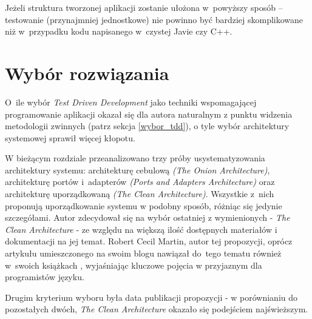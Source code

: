 Jeżeli struktura tworzonej aplikacji zostanie ułożona w~powyższy sposób – testowanie (przynajmniej jednostkowe) nie powinno być bardziej skomplikowane niż w~przypadku kodu napisanego w~czystej Javie czy C++.

\section{Wybór rozwiązania}
\label{wybor_rozwiazania}
O~ile wybór \textit{Test Driven Development} jako techniki wspomagającej programowanie aplikacji okazał się dla autora naturalnym z punktu widzenia metodologii zwinnych (patrz sekcja \ref{wybor_tdd}), o tyle wybór architektury systemowej sprawił więcej kłopotu. 

W bieżącym rozdziale przeanalizowano trzy próby usystematyzowania architektury systemu: architekturę cebulową \textit{(The Onion Architecture)}, architekturę portów i~adapterów \textit{(Ports and Adapters Architecture)} oraz architekturę uporządkowaną \textit{(The Clean Architecture)}. Wszystkie z~nich proponują uporządkowanie systemu w podobny sposób, różniąc się jedynie szczegółami. Autor zdecydował się na wybór ostatniej z wymienionych - \textit{The Clean Architecture} - ze względu na większą ilość dostępnych materiałów i dokumentacji na jej temat. Robert Cecil Martin, autor tej propozycji, oprócz artykułu umieszczonego na swoim blogu nawiązał do~tego tematu również w~swoich książkach \cite{bib:cecil:clean_code} \cite{bib:cecil:the_clean_coder} \cite{bib:cecil:agile}, wyjaśniając kluczowe pojęcia w przyjaznym dla programistów języku. 

Drugim kryterium wyboru była data publikacji propozycji - w porównianiu do pozostałych dwóch, \textit{The Clean Architecture} okazało się podejściem najświeższym.
